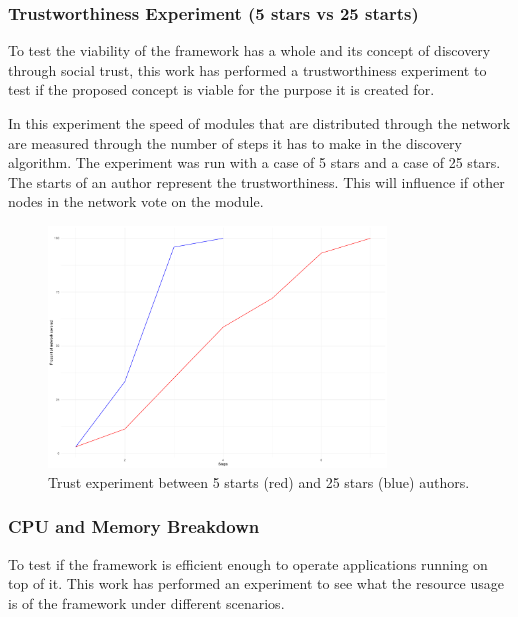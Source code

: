 
\subsubsection{\textbf{Trustworthiness Experiment (5 stars vs 25 starts)}}

To test the viability of the framework has a whole and its concept of discovery through social trust, this work has performed a trustworthiness experiment to test if the proposed concept is viable for the purpose it is created for.

In this experiment the speed of modules that are distributed through the network are measured through the number of steps it has to make in the discovery algorithm. The experiment was run with a case of 5 stars and a case of 25 stars. The starts of an author represent the trustworthiness. This will influence if other nodes in the network vote on the module.

\begin{figure}[h]
	\centering
	\includegraphics[width=0.8\textwidth]{images/trust.pdf}
	\caption{\label{fig:balance-scale} Trust experiment between 5 starts (red) and 25 stars (blue) authors.}
\end{figure}

\subsubsection{\textbf{CPU and Memory Breakdown}}

To test if the framework is efficient enough to operate applications running on top of it. This work has performed an experiment to see what the resource usage is of the framework under different scenarios.

